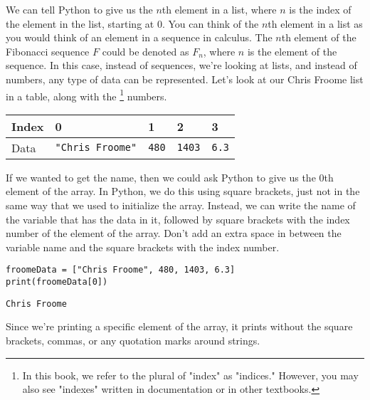 We can tell Python to give us the $n$th element in a list, where $n$ is the index of the element in the list, starting at 0. You can think of the $n$th element in a list as you would think of an element in a sequence in calculus. The $n$th element of the Fibonacci sequence $F$ could be denoted as $F_{n}$, where $n$ is the element of the sequence. In this case, instead of sequences, we're looking at lists, and instead of numbers, any type of data can be represented. Let's look at our Chris Froome list in a table, along with the \footnote{In this book, we refer to the plural of "index" as "indices." However, you may also see "indexes" written in documentation or in other textbooks.} numbers.\par
\vspace{5mm}
\begin{tabular}{|l|l|l|l|l|}
\hline
Index & 0              & 1   & 2    & 3   \\
\hline
Data  & \verb|"Chris Froome"| & \verb|480| & \verb|1403| & \verb|6.3|\\
\hline
\end{tabular}\par
\vspace{5mm}
\par
If we wanted to get the name, then we could ask Python to give us the 0th element of the array. In Python, we do this using square brackets, just not in the same way that we used to initialize the array. Instead, we can write the name of the variable that has the data in it, followed by square brackets with the index number of the element of the array. Don't add an extra space in between the variable name and the square brackets with the index number.\par
\begin{lstlisting}[style=pippython]
froomeData = ["Chris Froome", 480, 1403, 6.3]
print(froomeData[0])
\end{lstlisting}
\begin{lstlisting}[style=none]
Chris Froome
\end{lstlisting}
Since we're printing a specific element of the array, it prints without the square brackets, commas, or any quotation marks around strings.\par
